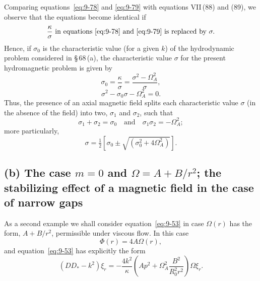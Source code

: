 Comparing equations~\eqref{eq:9-78} and \eqref{eq:9-79} with equations VII\,(88) and (89), we observe that the equations become identical if
\begin{equation}
\frac{\kappa}{\sigma} \text{ in equations \eqref{eq:9-78} and \eqref{eq:9-79} is replaced by } \sigma. \label{eq:9-80}
\end{equation}
Hence, if $\sigma_0$ is the characteristic value (for a given $k$) of the hydrodynamic problem considered in \S\,68\,(a), the characteristic value $\sigma$ for the present hydromagnetic problem is given by
\begin{equation}
\sigma_0 = \frac{\kappa}{\sigma} = \frac{\sigma^2 - \Omega_A^2}{\sigma}, \label{eq:9-81}
\end{equation}
\begin{equation}
\sigma^2 - \sigma_0 \sigma - \Omega_A^2 = 0. \label{eq:9-82}
\end{equation}
Thus, the presence of an axial magnetic field splits each characteristic value $\sigma$ (in the absence of the field) into two, $\sigma_1$ and $\sigma_2$, such that
\begin{equation}
\sigma_1 + \sigma_2 = \sigma_0 \quad \text{and} \quad \sigma_1 \sigma_2 = -\Omega_A^2; \label{eq:9-83}
\end{equation}
more particularly,
\begin{equation}
\sigma = \tfrac{1}{2}[\sigma_0 \pm \sqrt{(\sigma_0^2 + 4\Omega_A^2)}]. \label{eq:9-84}
\end{equation}

\subsection*{(b) The case $m = 0$ and $\Omega = A + B/r^2$; the stabilizing effect of a magnetic field in the case of narrow gaps}

As a second example we shall consider equation~\eqref{eq:9-53} in case $\Omega(r)$ has the form, $A + B/r^2$, permissible under viscous flow. In this case
\begin{equation}
\Phi(r) = 4A\Omega(r), \label{eq:9-85}
\end{equation}
and equation~\eqref{eq:9-53} has explicitly the form
\begin{equation}
(DD_* - k^2)\xi_r = -\frac{4k^2}{\kappa}\left(Ap^2 + \Omega_A^2 \frac{B^2}{R_0^2 r^2}\right)\Omega\xi_r. \label{eq:9-86}
\end{equation}

